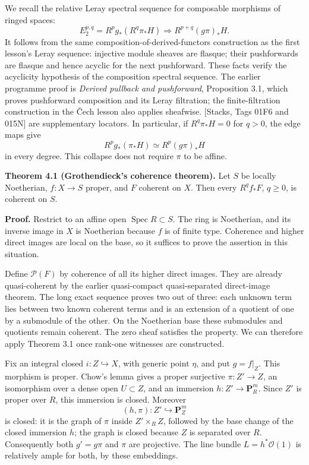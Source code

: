 \documentclass[11pt]{article}
\begin{document}
We recall the relative Leray spectral sequence for composable morphisms
of ringed spaces: \[
E_2^{p,q}=R^pg_*(R^q\pi_*H)
\Longrightarrow R^{p+q}(g\pi)_*H.
\] It follows from the same composition-of-derived-functors construction
as the first lesson's Leray sequence: injective module sheaves are
flasque; their pushforwards are flasque and hence acyclic for the next
pushforward. These facts verify the acyclicity hypothesis of the
composition spectral sequence. The earlier programme proof is
\emph{Derived pullback and pushforward}, Proposition 3.1, which proves
pushforward composition and its Leray filtration; the finite-filtration
construction in the Čech lesson also applies sheafwise. {[}Stacks, Tags
01F6 and 015N{]} are supplementary locators. In particular, if
\(R^q\pi_*H=0\) for \(q>0\), the edge maps give \[
R^pg_*(\pi_*H)\simeq R^p(g\pi)_*H
\] in every degree. This collapse does not require \(\pi\) to be affine.

\textbf{Theorem 4.1 (Grothendieck's coherence theorem).} Let \(S\) be
locally Noetherian, \(f:X\to S\) proper, and \(F\) coherent on \(X\).
Then every \(R^qf_*F\), \(q\ge0\), is coherent on \(S\).

\textbf{Proof.} Restrict to an affine open
\(\operatorname{Spec}R\subset S\). The ring is Noetherian, and its
inverse image in \(X\) is Noetherian because \(f\) is of finite type.
Coherence and higher direct images are local on the base, so it suffices
to prove the assertion in this situation.

Define \(\mathcal P(F)\) by coherence of all its higher direct images.
They are already quasi-coherent by the earlier quasi-compact
quasi-separated direct-image theorem. The long exact sequence proves two
out of three: each unknown term lies between two known coherent terms
and is an extension of a quotient of one by a submodule of the other. On
the Noetherian base these submodules and quotients remain coherent. The
zero sheaf satisfies the property. We can therefore apply Theorem 3.1
once rank-one witnesses are constructed.

Fix an integral closed \(i:Z\hookrightarrow X\), with generic point
\(\eta\), and put \(g=f|_Z\). This morphism is proper. Chow's lemma
gives a proper surjective \(\pi:Z'\to Z\), an isomorphism over a dense
open \(U\subset Z\), and an immersion \(h:Z'\to\mathbf P_R^m\). Since
\(Z'\) is proper over \(R\), this immersion is closed. Moreover \[
(h,\pi):Z'\hookrightarrow\mathbf P_Z^m
\] is closed: it is the graph of \(\pi\) inside \(Z'\times_R Z\),
followed by the base change of the closed immersion \(h\); the graph is
closed because \(Z\) is separated over \(R\). Consequently both
\(g'=g\pi\) and \(\pi\) are projective. The line bundle
\(L=h^*\mathcal O(1)\) is relatively ample for both, by these
embeddings.
\end{document}
